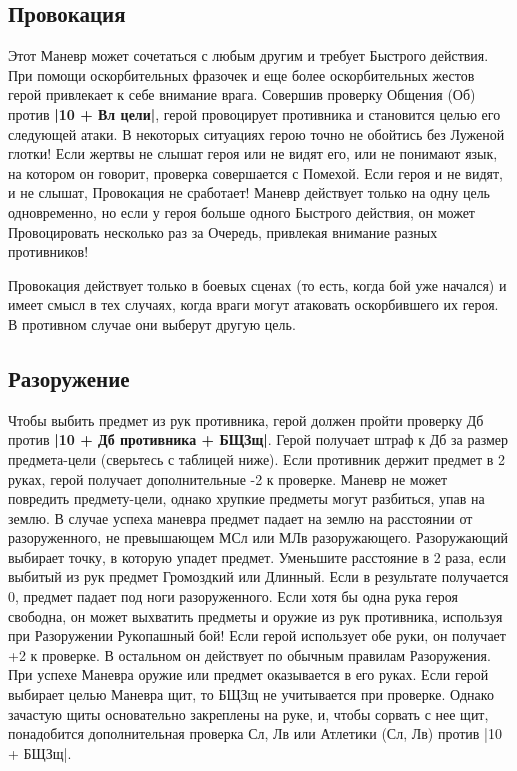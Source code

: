 \subsection{Провокация}
Этот Маневр может сочетаться с любым другим и требует Быстрого действия. При помощи оскорбительных фразочек и еще более оскорбительных жестов герой привлекает к себе внимание врага. Совершив проверку Общения (Об) против \textbf{|10 + Вл цели|}, герой провоцирует противника и становится целью его следующей атаки. В некоторых ситуациях герою точно не обойтись без Луженой глотки!
Если жертвы не слышат героя или не видят его, или не понимают язык, на котором он говорит, проверка совершается с Помехой. Если героя и не видят, и не слышат, Провокация не сработает! Маневр действует только на одну цель одновременно, но если у героя больше одного Быстрого действия, он может Провоцировать несколько раз за Очередь, привлекая внимание разных противников!
\begin{tcolorbox}
Провокация действует только в боевых сценах (то есть, когда бой уже начался) и имеет смысл в тех случаях, когда враги могут атаковать оскорбившего их героя. В противном случае они выберут другую цель. 
\end{tcolorbox}
\subsection{Разоружение}
Чтобы выбить предмет из рук противника, герой должен пройти проверку Дб против \textbf{|10 + Дб противника + БЩЗщ|}. Герой получает штраф к Дб за размер предмета-цели (сверьтесь с таблицей ниже). Если противник держит предмет в 2 руках, герой получает дополнительные -2 к проверке. Маневр не может повредить предмету-цели, однако хрупкие предметы могут разбиться, упав на землю. В случае успеха маневра предмет падает на землю на расстоянии от разоруженного, не превышающем МСл или МЛв разоружающего. Разоружающий выбирает точку, в которую упадет предмет. Уменьшите расстояние в 2 раза, если выбитый из рук предмет Громоздкий или Длинный. Если в результате получается 0, предмет падает под ноги разоруженного.
\newline
Если хотя бы одна рука героя свободна, он может выхватить предметы и оружие из рук противника, используя при Разоружении Рукопашный бой! Если герой использует обе руки, он получает +2 к проверке. В остальном он действует по обычным правилам Разоружения. При успехе Маневра оружие или предмет оказывается в его руках. Если герой выбирает целью Маневра щит, то БЩЗщ не учитывается при проверке. Однако зачастую щиты основательно закреплены на руке, и, чтобы сорвать с нее щит, понадобится дополнительная проверка Сл, Лв или Атлетики (Сл, Лв) против |10 + БЩЗщ|.
